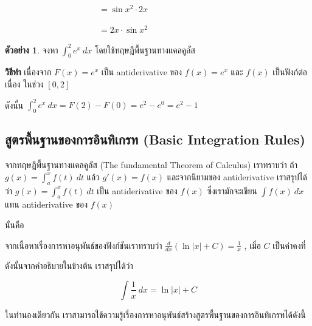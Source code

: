 \documentclass[
]{book}
\theoremstyle{definition}
\theoremstyle{definition}
\newtheorem{example}{ตัวอย่าง}[chapter]
\theoremstyle{definition}
\theoremstyle{definition}
\theoremstyle{remark}
\begin{document}
\(\qquad \qquad \qquad \qquad \qquad \quad =\displaystyle \sin x^{2}\cdot 2x\)

\(\qquad \qquad \qquad \qquad \qquad \quad =\displaystyle 2x\cdot \sin x^{2}\)

\begin{example}
จงหา \(\displaystyle \int_{0}^{2}e^{x} \ dx\) โดยใช้ทฤษฎีพื้นฐานทางแคลคูลัส
\end{example}

\textbf{วิธีทำ} เนื่องจาก \(F(x)=e^{x}\) เป็น antiderivative ของ \(f(x)=e^{x}\) และ
\(f(x)\) เป็นฟังก์ต่อเนื่อง ในช่วง \([0,2]\)

ดังนั้น \(\displaystyle \int_{0}^{2}e^{x}\ dx = F(2)-F(0) =e^{2}-e^{0} =
e^{2}-1\)

\subsection{สูตรพื้นฐานของการอินทิเกรท (Basic Integration Rules)}\label{uxe2auxe15uxe23uxe1euxe19uxe10uxe32uxe19uxe02uxe2duxe07uxe01uxe32uxe23uxe2duxe19uxe17uxe40uxe01uxe23uxe17-basic-integration-rules}

จากทฤษฎีพื้นฐานทางแคลคูลัส (The fundamental Theorem of Calculus) เราทราบว่า ถ้า
\(\displaystyle g(x)=\int_{a}^{x}f(t) \ dt\) แล้ว \(g'(x)=f(x)\)
และจากนิยามของ antiderivative เราสรุปได้ว่า
\(\displaystyle g(x)=\int_{a}^{x}f(t) \ dt\) เป็น antiderivative ของ \(f(x)\)
ซึ่งเรามักจะเขียน \(\displaystyle \int f(x) \ dx\) แทน antiderivative ของ
\(f(x)\)

นั่นคือ

จากเนื้อหาเรื่องการหาอนุพันธ์ของฟังก์ชันเราทราบว่า
\(\displaystyle \frac{d}{dx} \left( \ln |x|+C
\right)=\frac{1}{x}\) , เมื่อ \(C\) เป็นค่าคงที่

ดังนั้นจากคำอธิบายในข้างต้น เราสรุปได้ว่า

\[\displaystyle \int \frac{1}{x} \ dx = \ln|x|+C\]

ในทำนองเดียวกัน
เราสามารถใช้ความรู้เรื่องการหาอนุพันธ์สร้างสูตรพื้นฐานของการอินทิเกรทได้ดังนี้
\end{document}
